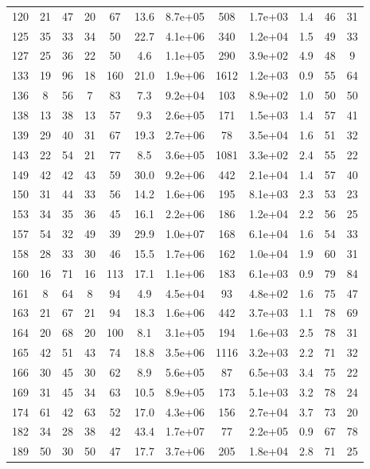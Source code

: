 \begin{table}
\begin{tabular}{cccccccccccc}
120 & 21 & 47 & 20 & 67 & 13.6 & 8.7e+05 & 508 & 1.7e+03 & 1.4 & 46 & 31 \\
125 & 35 & 33 & 34 & 50 & 22.7 & 4.1e+06 & 340 & 1.2e+04 & 1.5 & 49 & 33 \\
127 & 25 & 36 & 22 & 50 & 4.6 & 1.1e+05 & 290 & 3.9e+02 & 4.9 & 48 & 9 \\
133 & 19 & 96 & 18 & 160 & 21.0 & 1.9e+06 & 1612 & 1.2e+03 & 0.9 & 55 & 64 \\
136 & 8 & 56 & 7 & 83 & 7.3 & 9.2e+04 & 103 & 8.9e+02 & 1.0 & 50 & 50 \\
138 & 13 & 38 & 13 & 57 & 9.3 & 2.6e+05 & 171 & 1.5e+03 & 1.4 & 57 & 41 \\
139 & 29 & 40 & 31 & 67 & 19.3 & 2.7e+06 & 78 & 3.5e+04 & 1.6 & 51 & 32 \\
143 & 22 & 54 & 21 & 77 & 8.5 & 3.6e+05 & 1081 & 3.3e+02 & 2.4 & 55 & 22 \\
149 & 42 & 42 & 43 & 59 & 30.0 & 9.2e+06 & 442 & 2.1e+04 & 1.4 & 57 & 40 \\
150 & 31 & 44 & 33 & 56 & 14.2 & 1.6e+06 & 195 & 8.1e+03 & 2.3 & 53 & 23 \\
153 & 34 & 35 & 36 & 45 & 16.1 & 2.2e+06 & 186 & 1.2e+04 & 2.2 & 56 & 25 \\
157 & 54 & 32 & 49 & 39 & 29.9 & 1.0e+07 & 168 & 6.1e+04 & 1.6 & 54 & 33 \\
158 & 28 & 33 & 30 & 46 & 15.5 & 1.7e+06 & 162 & 1.0e+04 & 1.9 & 60 & 31 \\
160 & 16 & 71 & 16 & 113 & 17.1 & 1.1e+06 & 183 & 6.1e+03 & 0.9 & 79 & 84 \\
161 & 8 & 64 & 8 & 94 & 4.9 & 4.5e+04 & 93 & 4.8e+02 & 1.6 & 75 & 47 \\
163 & 21 & 67 & 21 & 94 & 18.3 & 1.6e+06 & 442 & 3.7e+03 & 1.1 & 78 & 69 \\
164 & 20 & 68 & 20 & 100 & 8.1 & 3.1e+05 & 194 & 1.6e+03 & 2.5 & 78 & 31 \\
165 & 42 & 51 & 43 & 74 & 18.8 & 3.5e+06 & 1116 & 3.2e+03 & 2.2 & 71 & 32 \\
166 & 30 & 45 & 30 & 62 & 8.9 & 5.6e+05 & 87 & 6.5e+03 & 3.4 & 75 & 22 \\
169 & 31 & 45 & 34 & 63 & 10.5 & 8.9e+05 & 173 & 5.1e+03 & 3.2 & 78 & 24 \\
174 & 61 & 42 & 63 & 52 & 17.0 & 4.3e+06 & 156 & 2.7e+04 & 3.7 & 73 & 20 \\
182 & 34 & 28 & 38 & 42 & 43.4 & 1.7e+07 & 77 & 2.2e+05 & 0.9 & 67 & 78 \\
189 & 50 & 30 & 50 & 47 & 17.7 & 3.7e+06 & 205 & 1.8e+04 & 2.8 & 71 & 25 \\

\end{tabular}
\end{table}
